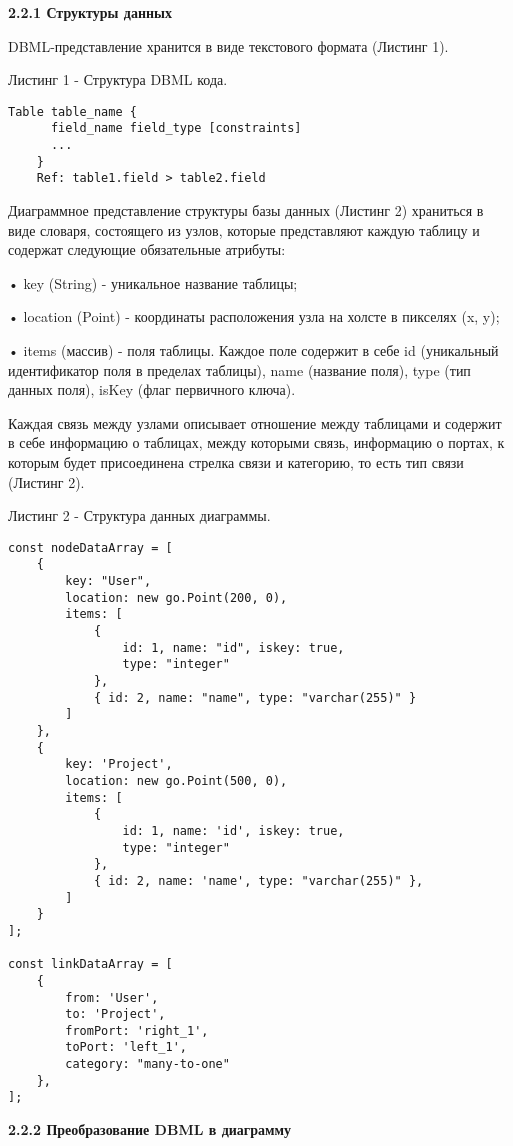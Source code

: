 \textbf{\large 2.2.1 Структуры данных}

DBML-представление хранится в виде текстового формата (Листинг 1).

Листинг 1 - Структура DBML кода.
\begin{lstlisting}[frame=single]
    Table table_name {
      field_name field_type [constraints]
      ...
    }
    Ref: table1.field > table2.field
\end{lstlisting}

Диаграммное представление структуры базы данных (Листинг 2) храниться в виде словаря, состоящего из узлов, которые представляют каждую таблицу  и содержат следующие обязательные атрибуты:

• key (String) - уникальное название таблицы;

• location (Point) - координаты расположения узла на холсте в пикселях (x, y);

• items (массив) - поля таблицы. Каждое поле содержит в себе id (уникальный идентификатор поля в пределах таблицы), name (название поля), type (тип данных поля), isKey (флаг первичного ключа). 

Каждая связь между узлами описывает отношение между таблицами и содержит в себе информацию о таблицах, между которыми связь, информацию о портах, к которым будет присоединена стрелка связи и категорию, то есть тип связи (Листинг 2). 

Листинг 2 - Структура данных диаграммы.
\begin{lstlisting}[frame=single]
const nodeDataArray = [
    {
        key: "User",
        location: new go.Point(200, 0),
        items: [
            {
                id: 1, name: "id", iskey: true,
                type: "integer"
            },
            { id: 2, name: "name", type: "varchar(255)" }
        ]
    },
    {
        key: 'Project',
        location: new go.Point(500, 0),
        items: [
            {
                id: 1, name: 'id', iskey: true,
                type: "integer"
            },
            { id: 2, name: 'name', type: "varchar(255)" },
        ]
    }
];

const linkDataArray = [
    {
        from: 'User',
        to: 'Project',
        fromPort: 'right_1',
        toPort: 'left_1',
        category: "many-to-one"
    },
];
\end{lstlisting}


\textbf{\large 2.2.2 Преобразование DBML в диаграмму}

